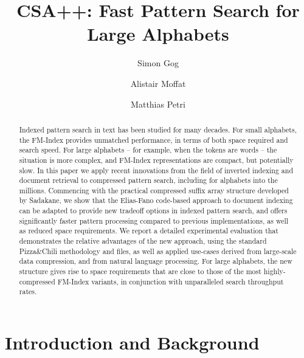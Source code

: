 \documentclass{llncs}
\begin{document}
\title{
CSA++:
Fast Pattern Search for Large Alphabets
}

\author{
Simon Gog
\and Alistair Moffat
\and Matthias Petri
}


\maketitle

\begin{abstract}
Indexed pattern search in text has been studied for many decades.
For small alphabets, the FM-Index provides unmatched performance, in
terms of both space required and search speed.
For large alphabets -- for example, when the tokens are words -- the
situation is more complex, and FM-Index representations are compact,
but potentially slow.
In this paper we apply recent innovations from the field of inverted
indexing and document retrieval to compressed pattern search,
including for alphabets into the millions.
Commencing with the practical compressed suffix array structure
developed by Sadakane, we show that the Elias-Fano code-based
approach to document indexing can be adapted to provide new tradeoff
options in indexed pattern search, and offers significantly faster
pattern processing compared to previous implementations, as well as
reduced space requirements.
We report a detailed experimental evaluation that demonstrates the
relative advantages of the new approach, using the standard
Pizza\&Chili methodology and files, as well as applied use-cases
derived from large-scale data compression, and from natural language
processing.
For large alphabets, the new structure gives rise to space
requirements that are close to those of the most highly-compressed
FM-Index variants, in conjunction with unparalleled search throughput
rates.

\end{abstract}

\section{Introduction and Background}
\label{sec-introduction}
\end{document}
